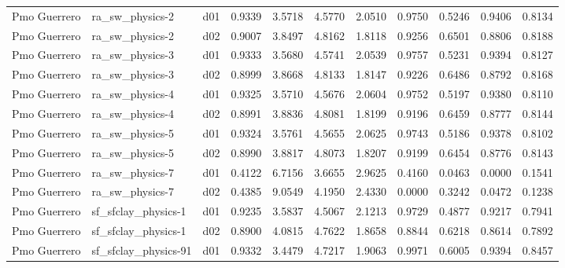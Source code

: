 \begin{longtable}{lllrrrrrrrr}
         Pmo Guerrero  &       ra\_sw\_physics-2 &     d01 &   0.9339 &   3.5718 &   4.5770 &       2.0510 &        0.9750 &       0.5246 &           0.9406 &  0.8134 \\
         Pmo Guerrero  &       ra\_sw\_physics-2 &     d02 &   0.9007 &   3.8497 &   4.8162 &       1.8118 &        0.9256 &       0.6501 &           0.8806 &  0.8188 \\
         Pmo Guerrero  &       ra\_sw\_physics-3 &     d01 &   0.9333 &   3.5680 &   4.5741 &       2.0539 &        0.9757 &       0.5231 &           0.9394 &  0.8127 \\
         Pmo Guerrero  &       ra\_sw\_physics-3 &     d02 &   0.8999 &   3.8668 &   4.8133 &       1.8147 &        0.9226 &       0.6486 &           0.8792 &  0.8168 \\
         Pmo Guerrero  &       ra\_sw\_physics-4 &     d01 &   0.9325 &   3.5710 &   4.5676 &       2.0604 &        0.9752 &       0.5197 &           0.9380 &  0.8110 \\
         Pmo Guerrero  &       ra\_sw\_physics-4 &     d02 &   0.8991 &   3.8836 &   4.8081 &       1.8199 &        0.9196 &       0.6459 &           0.8777 &  0.8144 \\
         Pmo Guerrero  &       ra\_sw\_physics-5 &     d01 &   0.9324 &   3.5761 &   4.5655 &       2.0625 &        0.9743 &       0.5186 &           0.9378 &  0.8102 \\
         Pmo Guerrero  &       ra\_sw\_physics-5 &     d02 &   0.8990 &   3.8817 &   4.8073 &       1.8207 &        0.9199 &       0.6454 &           0.8776 &  0.8143 \\
         Pmo Guerrero  &       ra\_sw\_physics-7 &     d01 &   0.4122 &   6.7156 &   3.6655 &       2.9625 &        0.4160 &       0.0463 &           0.0000 &  0.1541 \\
         Pmo Guerrero  &       ra\_sw\_physics-7 &     d02 &   0.4385 &   9.0549 &   4.1950 &       2.4330 &        0.0000 &       0.3242 &           0.0472 &  0.1238 \\
         Pmo Guerrero  &   sf\_sfclay\_physics-1 &     d01 &   0.9235 &   3.5837 &   4.5067 &       2.1213 &        0.9729 &       0.4877 &           0.9217 &  0.7941 \\
         Pmo Guerrero  &   sf\_sfclay\_physics-1 &     d02 &   0.8900 &   4.0815 &   4.7622 &       1.8658 &        0.8844 &       0.6218 &           0.8614 &  0.7892 \\
         Pmo Guerrero  &  sf\_sfclay\_physics-91 &     d01 &   0.9332 &   3.4479 &   4.7217 &       1.9063 &        0.9971 &       0.6005 &           0.9394 &  0.8457 \\

\end{longtable}
